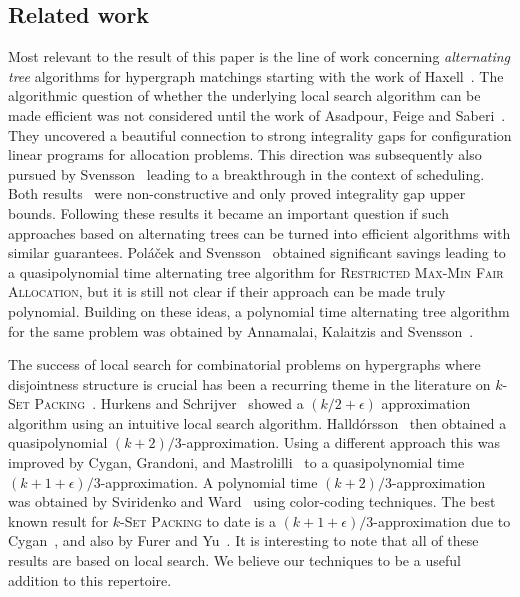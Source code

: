 \documentclass[11pt]{article}
\theoremstyle{definition}
\theoremstyle{remark}
\newcommand{\problemmacro}[1]{\texorpdfstring{\textsc{#1}}{#1}\xspace}
\begin{document}
\subsection{Related work}
Most relevant to the result of this paper is the line of work
concerning \emph{alternating tree} algorithms for hypergraph matchings
starting with the work of Haxell~\cite{haxell1995condition}. The
algorithmic question of whether the underlying local search algorithm
can be made efficient was not considered until the work of Asadpour,
Feige and Saberi~\cite{asadpour2012santa}. They uncovered a beautiful
connection to strong integrality gaps for configuration linear
programs for allocation problems. This direction was subsequently also
pursued by Svensson~\cite{svensson2012santa} leading to a
breakthrough in the context of scheduling. Both
results~\cite{asadpour2012santa,svensson2012santa} were
non-constructive and only proved integrality gap upper
bounds. Following these results it became an important question if
such approaches based on alternating trees can be turned into
efficient algorithms with similar guarantees. Pol\'a\v{c}ek and
Svensson~\cite{polacek2012quasi} obtained significant savings leading
to a quasipolynomial time alternating tree algorithm for
\problemmacro{Restricted Max-Min Fair Allocation}, but it is still not
clear if their approach can be made truly polynomial. Building on
these ideas, a polynomial time alternating tree algorithm for the same
problem was obtained by Annamalai, Kalaitzis and
Svensson~\cite{DBLP:conf/soda/AnnamalaiKS15}.

The success of local search for combinatorial problems on hypergraphs
where disjointness structure is crucial has been a recurring theme in
the literature on \problemmacro{$k$-Set
  Packing}~\cite{karp1972reducibility}. Hurkens and
Schrijver~\cite{hurkens1989size} showed a $(k/2+\epsilon)$
approximation algorithm using an intuitive local search
algorithm. Halld\'orsson~\cite{halldorsson1995approximating} then
obtained a quasipolynomial $(k+2)/3$-approximation. Using a different
approach this was improved by Cygan, Grandoni, and
Mastrolilli~\cite{cygan2013sell} to a quasipolynomial time
$(k+1+\epsilon)/3$-approximation. A polynomial time
$(k+2)/3$-approximation was obtained by Sviridenko and
Ward~\cite{sviridenko2013large} using color-coding techniques. The
best known result for \problemmacro{$k$-Set Packing} to date is a
$(k+1+\epsilon)/3$-approximation due to
Cygan~\cite{cygan2013improved}, and also by Furer and
Yu~\cite{furer2014approximating}. It is interesting to note that all
of these results are based on local search. We believe our techniques
to be a useful addition to this repertoire.
\end{document}

